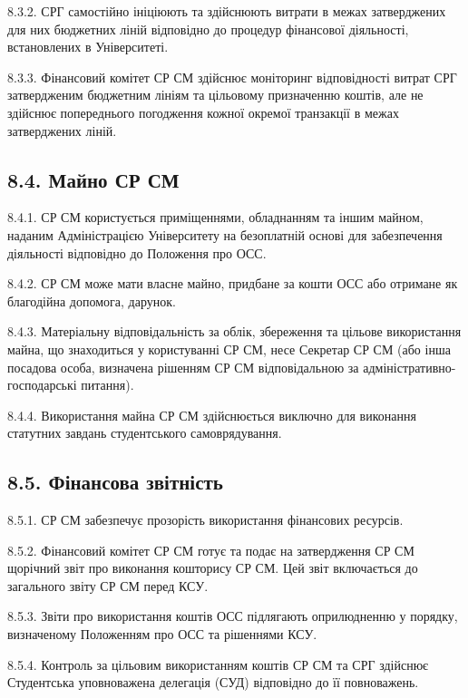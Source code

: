     8.3.2. СРГ самостійно ініціюють та здійснюють витрати в межах затверджених для них бюджетних ліній відповідно до процедур фінансової діяльності, встановлених в Університеті.

    8.3.3. Фінансовий комітет СР СМ здійснює моніторинг відповідності витрат СРГ затвердженим бюджетним лініям та цільовому призначенню коштів, але не здійснює попереднього погодження кожної окремої транзакції в межах затверджених ліній.

\subsection*{8.4. Майно СР СМ}
    8.4.1. СР СМ користується приміщеннями, обладнанням та іншим майном, наданим Адміністрацією Університету на безоплатній основі для забезпечення діяльності відповідно до Положення про ОСС.

    8.4.2. СР СМ може мати власне майно, придбане за кошти ОСС або отримане як благодійна допомога, дарунок.

    8.4.3. Матеріальну відповідальність за облік, збереження та цільове використання майна, що знаходиться у користуванні СР СМ, несе Секретар СР СМ (або інша посадова особа, визначена рішенням СР СМ відповідальною за адміністративно-господарські питання).

    8.4.4. Використання майна СР СМ здійснюється виключно для виконання статутних завдань студентського самоврядування.

\subsection*{8.5. Фінансова звітність}
    8.5.1. СР СМ забезпечує прозорість використання фінансових ресурсів.

    8.5.2. Фінансовий комітет СР СМ готує та подає на затвердження СР СМ щорічний звіт про виконання кошторису СР СМ. Цей звіт включається до загального звіту СР СМ перед КСУ.

    8.5.3. Звіти про використання коштів ОСС підлягають оприлюдненню у порядку, визначеному Положенням про ОСС та рішеннями КСУ.

    8.5.4. Контроль за цільовим використанням коштів СР СМ та СРГ здійснює Студентська уповноважена делегація (СУД) відповідно до її повноважень.

